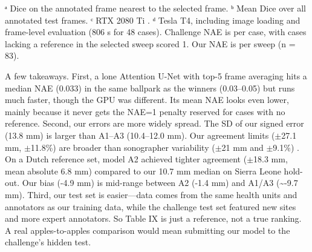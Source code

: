 \documentclass[conference]{IEEEtran}
\begin{document}
\begin{table}[t]
\centering
\caption{Our Attention U-Net vs the top three ACOUSLIC-AI entries (challenge figures from \cite{r18})}\label{tab:9}
\scriptsize
{}
\end{table}


ᵃ Dice on the annotated frame nearest to the selected frame. ᵇ Mean Dice over all annotated test frames. ᶜ RTX 2080 Ti \cite{r18}. ᵈ Tesla T4, including image loading and frame-level evaluation (806 s for 48 cases). Challenge NAE is per case, with cases lacking a reference in the selected sweep scored 1. Our NAE is per sweep (n = 83).



A few takeaways. First, a lone Attention U-Net with top-5 frame averaging hits a median NAE (0.033) in the same ballpark as the winners (0.03--0.05) but runs much faster, though the GPU was different. Its mean NAE looks even lower, mainly because it never gets the NAE=1 penalty reserved for cases with no reference. Second, our errors are more widely spread. The SD of our signed error (13.8 mm) is larger than A1--A3 (10.4--12.0 mm). Our agreement limits (\ensuremath{\pm}27.1 mm, \ensuremath{\pm}11.8\%) are broader than sonographer variability (\ensuremath{\pm}21 mm and \ensuremath{\pm}9.1\%) \cite{r15,r18}. On a Dutch reference set, model A2 achieved tighter agreement (\ensuremath{\pm}18.3 mm, mean absolute 6.8 mm) compared to our 10.7 mm median on Sierra Leone hold-out. Our bias (-4.9 mm) is mid-range between A2 (-1.4 mm) and A1/A3 (\textasciitilde{}-9.7 mm). Third, our test set is easier---data comes from the same health units and annotators as our training data, while the challenge test set featured new sites and more expert annotators. So Table IX is just a reference, not a true ranking. A real apples-to-apples comparison would mean submitting our model to the challenge's hidden test.
\end{document}
